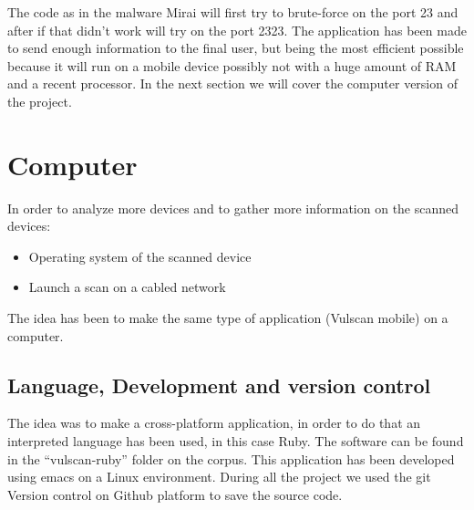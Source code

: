 \documentclass{report}
\begin{document}
The code as in the malware Mirai will first try to brute-force on the port 23 and after if that didn't work will try on the port 2323.\newline
The application has been made to send enough information to the final user, but being the most efficient possible because it will run on a mobile device possibly not with a huge amount of RAM and a recent processor.\newline
In the next section we will cover the computer version of the project.

\section{Computer}
In order to analyze more devices and to gather more information on the scanned devices:
\begin{itemize}
 \item Operating system of the scanned device
 \item Launch a scan on a cabled network
\end{itemize}
The idea has been to make the same type of application (Vulscan mobile) on a computer.

\subsection{Language, Development and version control}
The idea was to make a cross-platform application, in order to do that an interpreted language has been used, in this case Ruby.
The software can be found in the ``vulscan-ruby'' folder on the corpus. This application has been developed using emacs on a Linux environment.\newline
During all the project we used the git Version control on Github platform to save the source code.
\end{document}
